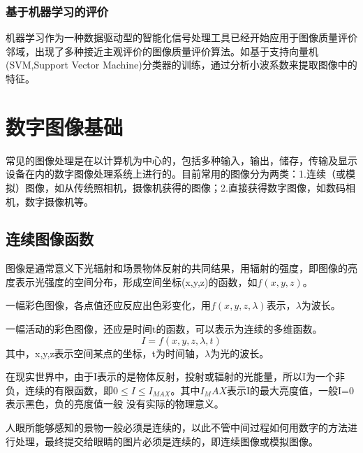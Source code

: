 \documentclass[11pt]{article}
\begin{document}
\subsubsection{基于机器学习的评价}
机器学习作为一种数据驱动型的智能化信号处理工具已经开始应用于图像质量评价邻域，出现了多种接近主观评价的图像质量评价算法。如基于支持向量机(SVM,Support Vector Machine)分类器的训练，通过分析小波系数来提取图像中的特征。
\section{数字图像基础}
常见的图像处理是在以计算机为中心的，包括多种输入，输出，储存，传输及显示设备在内的数字图像处理系统上进行的。目前常用的图像分为两类：1.连续（或模拟）图像，如从传统照相机，摄像机获得的图像；2.直接获得数字图像，如数码相机，数字摄像机等。
\subsection{连续图像函数}
图像是通常意义下光辐射和场景物体反射的共同结果，用辐射的强度，即图像的亮度表示光强度的空间分布，形成空间坐标(x,y,z)的函数，如$f(x,y,z)$。

一幅彩色图像，各点值还应反应出色彩变化，用$f(x,y,z,\lambda)$表示，$\lambda$为波长。

一幅活动的彩色图像，还应是时间t的函数，可以表示为连续的多维函数。
$$I = f(x,y,z,\lambda,t)$$
其中，x,y,z表示空间某点的坐标，t为时间轴，$\lambda$为光的波长。

在现实世界中，由于I表示的是物体反射，投射或辐射的光能量，所以I为一个非负，连续的有限函数，即$0\le I\le I_{MAX}$。其中$I_MAX$表示I的最大亮度值，一般I=0表示黑色，负的亮度值一般 没有实际的物理意义。 

人眼所能够感知的景物一般必须是连续的，以此不管中间过程如何用数字的方法进行处理，最终提交给眼睛的图片必须是连续的，即连续图像或模拟图像。
\end{document}
